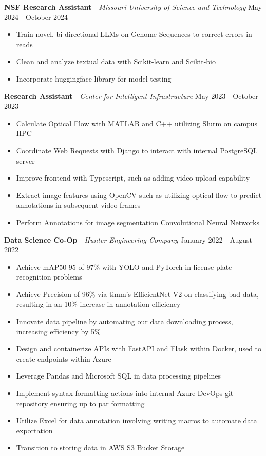 \documentclass[11pt]{article}
\begin{document}
\textbf{NSF Research Assistant} - \textsl{Missouri University of Science and Technology} \hfill May 2024 - October 2024
\begin{itemize}[noitemsep, topsep=0pt, partopsep=0pt, parsep=0pt, itemsep=0pt]
    \small
    \item Train novel, bi-directional LLMs on Genome Sequences to correct  errors in reads
    \item Clean and analyze textual data with Scikit-learn and Scikit-bio
    \item Incorporate huggingface library for model testing
\end{itemize}

\textbf{Research Assistant} - \textsl{Center for Intelligent Infrastructure} \hfill May 2023 - October 2023
\begin{itemize}[noitemsep, topsep=0pt, partopsep=0pt, parsep=0pt, itemsep=0pt]
    \small
    \item Calculate Optical Flow with MATLAB and C++ utilizing Slurm on campus HPC
    \item Coordinate Web Requests with Django to interact with internal PostgreSQL server
    \item Improve frontend with Typescript, such as adding video upload capability
    \item Extract image features using OpenCV such as utilizing optical flow to predict annotations in subsequent video frames
    \item Perform Annotations for image segmentation Convolutional Neural Networks
\end{itemize}


\textbf{Data Science Co-Op} - \textsl{Hunter Engineering Company} \hfill January 2022 - August 2022
\begin{itemize}[noitemsep, topsep=0pt, partopsep=0pt, parsep=0pt, itemsep=0pt]
    \small
    \item Achieve mAP50-95 of 97\% with YOLO and PyTorch in license plate recognition problems
    \item Achieve Precision of 96\% via timm's EfficientNet V2 on classifying bad data, resulting in an 10\% increase in annotation efficiency
    \item Innovate data pipeline by automating our data downloading process, increasing efficiency by 5\%
    \item Design and containerize APIs with FastAPI and Flask within Docker, used to create endpoints within Azure
    \item Leverage Pandas and Microsoft SQL in data processing pipelines
    \item Implement syntax formatting actions into internal Azure DevOps git repository ensuring up to par formatting
    \item Utilize Excel for data annotation involving writing macros to automate data exportation
    \item Transition to storing data in AWS S3 Bucket Storage
\end{itemize}
\end{document}
